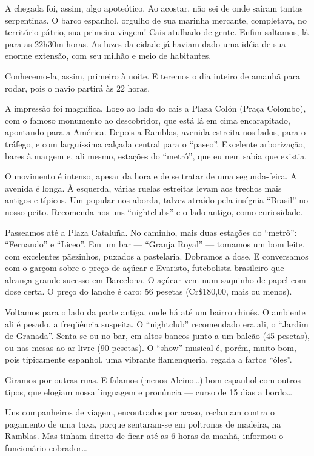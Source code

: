 A chegada foi, assim, algo apoteótico. Ao acostar, não sei de onde saíram tantas serpentinas. O barco espanhol, orgulho de sua marinha mercante, completava, no território pátrio, sua primeira viagem! Cais atulhado de gente. Enfim saltamos, lá para as 22h30m horas. As luzes da cidade já haviam dado uma idéia de sua enorme extensão, com seu milhão e meio de habitantes.

Conhecemo-la, assim, primeiro à noite. E teremos o dia inteiro de amanhã para rodar, pois o navio partirá às 22 horas.

A impressão foi magnífica. Logo ao lado do cais a Plaza Colón (Praça Colombo), com o famoso monumento ao descobridor, que está lá em cima encarapitado, apontando para a América. Depois a Ramblas, avenida estreita nos lados, para o tráfego, e com larguíssima calçada central para o ``paseo''. Excelente arborização, bares à margem e, ali mesmo, estações do ``metrô'', que eu nem sabia que existia.

O movimento é intenso, apesar da hora e de se tratar de uma segunda-feira. A avenida é longa. À esquerda, várias ruelas estreitas levam aos trechos mais antigos e típicos. Um popular nos aborda, talvez atraído pela insígnia ``Brasil'' no nosso peito. Recomenda-nos uns ``nightclubs'' e o lado antigo, como curiosidade.

Passeamos até a Plaza Cataluña. No caminho, mais duas estações do ``metrô'': ``Fernando'' e ``Liceo''. Em um bar --- ``Granja Royal'' --- tomamos um bom leite, com excelentes pãezinhos, puxados a pastelaria. Dobramos a dose. E conversamos com o garçom sobre o preço de açúcar e Evaristo, futebolista brasileiro que alcança grande sucesso em Barcelona. O açúcar vem num saquinho de papel com dose certa. O preço do lanche é caro: 56 pesetas (Cr\$180,00, mais ou menos).

Voltamos para o lado da parte antiga, onde há até um bairro chinês. O ambiente ali é pesado, a freqüência suspeita. O ``nightclub'' recomendado era ali, o ``Jardim de Granada''. Senta-se ou no bar, em altos bancos junto a um balcão (45 pesetas), ou nas mesas ao ar livre (90 pesetas). O ``show'' musical é, porém, muito bom, pois tipicamente espanhol, uma vibrante flamenqueria, regada a fartos ``óles''.

Giramos por outras ruas. E falamos (menos Alcino\ldots) bom espanhol com outros tipos, que elogiam nossa linguagem e pronúncia --- curso de 15 dias a bordo\ldots

Uns companheiros de viagem, encontrados por acaso, reclamam contra o pagamento de uma taxa, porque sentaram-se em poltronas de madeira, na Ramblas. Mas tinham direito de ficar até as 6 horas da manhã, informou o funcionário cobrador\ldots

